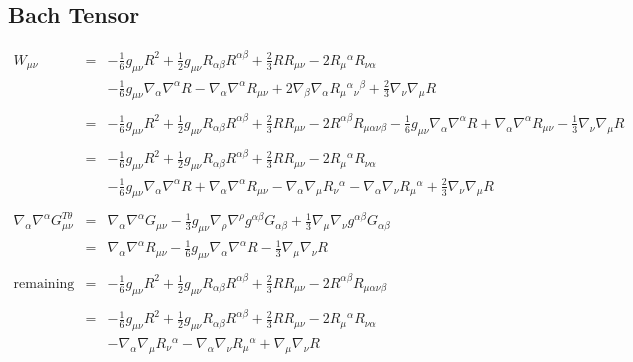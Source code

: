 \documentclass[10pt,letterpaper]{article}
\numberwithin{equation}{section}
\begin{document}
\newpage
\begin{appendices}
\section{Bach Tensor}
\begin{eqnarray}
W_{\mu\nu} &=& - \tfrac{1}{6} g_{\mu \nu} R^2 + \tfrac{1}{2} g_{\mu \nu} R_{\alpha \beta} R^{\alpha \beta} + \tfrac{2}{3} R R_{\mu \nu} - 2 R_{\mu}{}^{\alpha} R_{\nu \alpha} 
\nonumber\\
&&- \tfrac{1}{6} g_{\mu \nu} \nabla_{\alpha}\nabla^{\alpha}R -  \nabla_{\alpha}\nabla^{\alpha}R_{\mu \nu} + 2 \nabla_{\beta}\nabla_{\alpha}R_{\mu}{}^{\alpha}{}_{\nu}{}^{\beta} + \tfrac{2}{3} \nabla_{\nu}\nabla_{\mu}R
\nonumber\\ \nonumber\\
&=& - \tfrac{1}{6} g_{\mu \nu} R^2 + \tfrac{1}{2} g_{\mu \nu} R_{\alpha \beta} R^{\alpha \beta} + \tfrac{2}{3} R R_{\mu \nu} - 2 R^{\alpha \beta} R_{\mu \alpha \nu \beta} -  \tfrac{1}{6} g_{\mu \nu} \nabla_{\alpha}\nabla^{\alpha}R + \nabla_{\alpha}\nabla^{\alpha}R_{\mu \nu} -  \tfrac{1}{3} \nabla_{\nu}\nabla_{\mu}R
\nonumber\\ \nonumber\\
&=& - \tfrac{1}{6} g_{\mu \nu} R^2 + \tfrac{1}{2} g_{\mu \nu} R_{\alpha \beta} R^{\alpha \beta} + \tfrac{2}{3} R R_{\mu \nu} - 2 R_{\mu}{}^{\alpha} R_{\nu \alpha} 
\nonumber\\ 
&&-  \tfrac{1}{6} g_{\mu \nu} \nabla_{\alpha}\nabla^{\alpha}R + \nabla_{\alpha}\nabla^{\alpha}R_{\mu \nu} -  \nabla_{\alpha}\nabla_{\mu}R_{\nu}{}^{\alpha} -  \nabla_{\alpha}\nabla_{\nu}R_{\mu}{}^{\alpha} + \tfrac{2}{3} \nabla_{\nu}\nabla_{\mu}R
\nonumber\\ \nonumber\\
\nabla_\alpha \nabla^\alpha G^{T\theta}_{\mu\nu} &=&
\nabla_\alpha \nabla^\alpha G_{\mu\nu} -\tfrac13 g_{\mu\nu} \nabla_\rho \nabla^\rho g^{\alpha\beta} G_{\alpha\beta} +\tfrac13 \nabla_\mu\nabla_\nu g^{\alpha\beta}G_{\alpha\beta}
\nonumber\\
&=& \nabla_\alpha \nabla^\alpha R_{\mu\nu} - \tfrac16 g_{\mu\nu}\nabla_\alpha \nabla^\alpha R -\tfrac13 \nabla_\mu \nabla_\nu R
\nonumber\\ \nonumber\\
\text{remaining} &=&  -\tfrac{1}{6} g_{\mu \nu} R^2 + \tfrac{1}{2} g_{\mu \nu} R_{\alpha \beta} R^{\alpha \beta} + \tfrac{2}{3} R R_{\mu \nu} - 2 R^{\alpha \beta} R_{\mu \alpha \nu \beta}
\nonumber\\ \nonumber\\
&=&  - \tfrac{1}{6} g_{\mu \nu} R^2 + \tfrac{1}{2} g_{\mu \nu} R_{\alpha \beta} R^{\alpha \beta} + \tfrac{2}{3} R R_{\mu \nu} - 2 R_{\mu}{}^{\alpha} R_{\nu \alpha} 
\nonumber\\
&& -  \nabla_{\alpha}\nabla_{\mu}R_{\nu}{}^{\alpha} -  \nabla_{\alpha}\nabla_{\nu}R_{\mu}{}^{\alpha} + \nabla_\mu \nabla_\nu R
\end{eqnarray}


\end{appendices}
\end{document}
